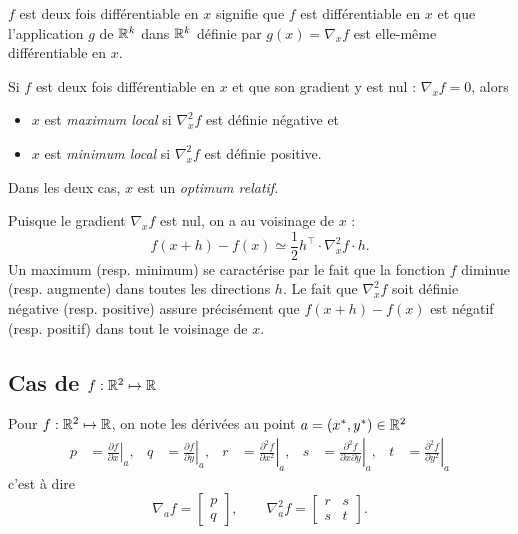 \remark
$f$ est deux fois différentiable en $x$ signifie que $f$ est différentiable en $x$ et que l'application $g$ de $\mathbb{R}^k$ dans $\mathbb{R}^k$ définie par $g(x) = \nabla_x f$ est elle-même différentiable en $x$.

\begin{definition}
  Si $f$ est deux fois différentiable en $x$ et que son gradient y est nul : $\nabla_xf = 0$, alors
  \begin{itemize}
   \item $x$ est {\em maximum local} si $\nabla^2_x f$ est définie négative et
   \item $x$ est {\em minimum local} si $\nabla^2_x f$ est définie positive.
  \end{itemize}
  Dans les deux cas, $x$ est un {\em optimum relatif}.
\end{definition}

\remark
Puisque le gradient $\nabla_x f$ est nul, on a au voisinage de $x$ :
$$
f(x+h) - f(x) \simeq \frac12 h^\top \cdot \nabla^2_x f \cdot h.
$$
Un maximum (resp. minimum) se caractérise par le fait que la fonction $f$ diminue (resp. augmente) dans toutes les directions $h$. Le fait que $\nabla^2_x f$ soit définie négative (resp. positive) assure précisément que $f(x+h) - f(x)$ est négatif (resp. positif) dans tout le voisinage de $x$.

\subsection*{Cas de $f : \mathbb{R}^2 \mapsto \mathbb{R}$}

\begin{definition}
  Pour $f : \mathbb{R}^2 \mapsto \mathbb{R}$, on note les dérivées au point $a = (x^*, y^*) \in \mathbb{R}^2$
  \begin{align*}
    p & = \left.\frac{\partial f}{\partial x}\right|_a, &
    q & = \left.\frac{\partial f}{\partial y}\right|_a, &
    r & = \left.\frac{\partial^2 f}{\partial x^2}\right|_a, &
    s & = \left.\frac{\partial^2 f}{\partial x \partial y}\right|_a, &
    t & = \left.\frac{\partial^2 f}{\partial y^2}\right|_a
  \end{align*}
  c'est à dire
  $$
  \nabla_af = \left[\begin{array}{c} p \\ q \end{array} \right], 
  \qquad 
  \nabla^2_af = \left[\begin{array}{cc} r & s \\ s & t \end{array} \right].
  $$
\end{definition}

